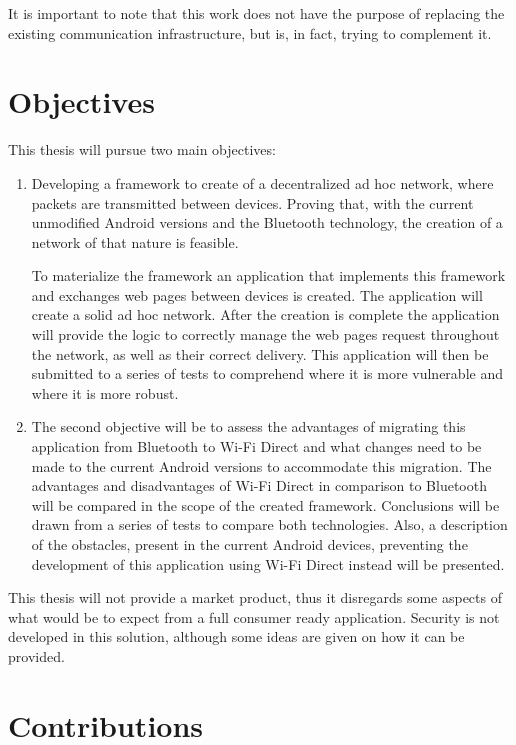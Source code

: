 It is important to note that this work does not have the purpose of replacing the existing communication infrastructure, but is, in fact, trying to complement it.

\section{Objectives}
\label{sec:objectives}

This thesis will pursue two main objectives:

\begin{enumerate}
	\item 
	Developing a framework to create of a decentralized ad hoc network, where packets are transmitted between devices. Proving that, with the current unmodified Android versions and the Bluetooth technology, the creation of a network of that nature is feasible.
	
	To materialize the framework an application that implements this framework and exchanges web pages between devices is created. The application will create a solid ad hoc network. After the creation is complete the application will provide the logic to correctly manage the web pages request throughout the network, as well as their correct delivery. This application will then be submitted to a series of tests to comprehend where it is more vulnerable and where it is more robust.
	
	\item 
	The second objective will be to assess the advantages of migrating this application from Bluetooth to Wi-Fi Direct and what changes need to be made to the current Android versions to accommodate this migration. The advantages and disadvantages of Wi-Fi Direct in comparison to Bluetooth will be compared in the scope of the created framework. Conclusions will be drawn from a series of tests to compare both technologies. Also, a description of the obstacles, present in the current Android devices, preventing the development of this application using Wi-Fi Direct instead will be presented.
	
\end{enumerate}

This thesis will not provide a market product, thus it disregards some aspects of what would be to expect from a full consumer ready application. Security is not developed in this solution, although some ideas are given on how it can be provided.

\section{Contributions}


